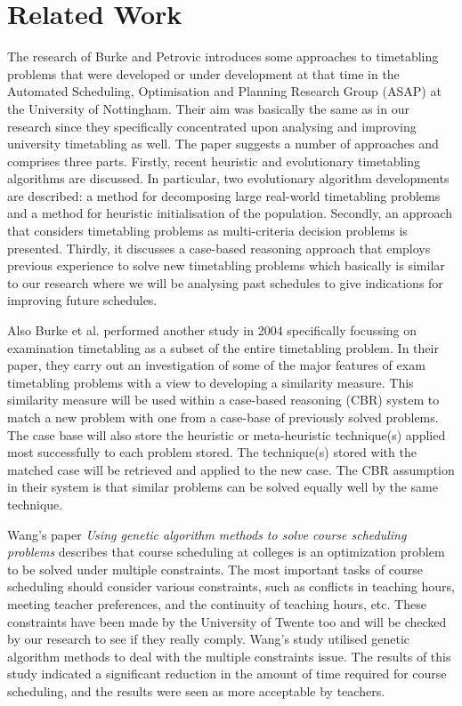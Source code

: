\section{Related Work}
The research of Burke and Petrovic \cite{recentResearchDirectionsInAutomatedTimetabling} introduces some approaches to timetabling problems that were developed or under development at that time in the Automated Scheduling, Optimisation and Planning Research Group (ASAP) at the University of Nottingham. Their aim was basically the same as in our research since they specifically concentrated upon analysing and improving university time\allowbreak tabling as well. The paper suggests a number of approaches and comprises three parts. Firstly, recent heuristic and evolutionary timetabling algorithms are discussed. In particular, two evolutionary algorithm developments are described: a method for decomposing large real-world time\allowbreak tabling problems and a method for heuristic initialisation of the population. Secondly, an approach that considers timetabling problems as multi-criteria decision problems is presented. Thirdly, it discusses a case-based reasoning approach that employs previous experience to solve new timetabling problems which basically is similar to our research where we will be analysing past schedules to give indications for improving future schedules.

Also Burke et al. performed another study in 2004 \cite{burke2004analysing} specifically focussing on examination timetabling as a subset of the entire timetabling problem. In their paper, they carry out an investigation of some of the major features of exam timetabling problems with a view to developing a similarity measure. This similarity measure will be used within a case-based reasoning (CBR) system to match a new problem with one from a case-base of previously solved problems. The case base will also store the heuristic or meta-heuristic technique(s) applied most successfully to each problem stored. The technique(s) stored with the matched case will be retrieved and applied to the new case. The CBR assumption in their system is that similar problems can be solved equally well by the same technique.

Wang's paper \textit{Using genetic algorithm methods to solve course scheduling problems} \cite{usingGeneticAlgorithmMethodsToSolveScheduling} describes that course scheduling at colleges is an optimization problem to be solved under multiple constraints. The most important tasks of course scheduling should consider various constraints, such as conflicts in teaching hours, meeting teacher preferences, and the continuity of teaching hours, etc. These constraints have been made by the University of Twente too and will be checked by our research to see if they really comply. Wang's study utilised genetic algorithm methods to deal with the multiple constraints issue. The results of this study indicated a significant reduction in the amount of time required for course scheduling, and the results were seen as more acceptable by teachers.

